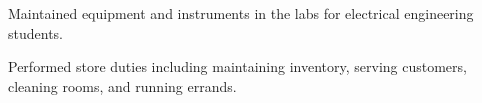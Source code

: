 


\begin{rExperience}

  \item Maintained equipment and instruments in the labs for electrical engineering students.

  \item Performed store duties including maintaining inventory, serving customers, cleaning rooms, and running errands.

\end{rExperience}
